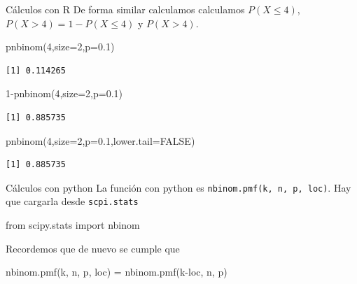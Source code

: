 \documentclass[
  ignorenonframetext,
  aspectratio=169]{beamer}
\newenvironment{Shaded}{\begin{snugshade}}{\end{snugshade}}
\newcommand{\AttributeTok}[1]{\textcolor[rgb]{0.40,0.45,0.13}{#1}}
\newcommand{\ConstantTok}[1]{\textcolor[rgb]{0.56,0.35,0.01}{#1}}
\newcommand{\DecValTok}[1]{\textcolor[rgb]{0.68,0.00,0.00}{#1}}
\newcommand{\FloatTok}[1]{\textcolor[rgb]{0.68,0.00,0.00}{#1}}
\newcommand{\FunctionTok}[1]{\textcolor[rgb]{0.28,0.35,0.67}{#1}}
\newcommand{\ImportTok}[1]{\textcolor[rgb]{0.00,0.46,0.62}{#1}}
\newcommand{\NormalTok}[1]{\textcolor[rgb]{0.00,0.23,0.31}{#1}}
\newcommand{\OperatorTok}[1]{\textcolor[rgb]{0.37,0.37,0.37}{#1}}
\newcommand{\SpecialCharTok}[1]{\textcolor[rgb]{0.37,0.37,0.37}{#1}}
\begin{document}
\begin{frame}[fragile]{Cálculos con R}
\protect\hypertarget{cuxe1lculos-con-r-3}{}
De forma similar calculamos calculamos \(P(X\leq 4)\),
\(P(X>4)=1-P(X\leq 4)\) y \(P(X>4)\).

\begin{Shaded}
\begin{Highlighting}[]
\FunctionTok{pnbinom}\NormalTok{(}\DecValTok{4}\NormalTok{,}\AttributeTok{size=}\DecValTok{2}\NormalTok{,}\AttributeTok{p=}\FloatTok{0.1}\NormalTok{)}
\end{Highlighting}
\end{Shaded}

\begin{verbatim}
[1] 0.114265
\end{verbatim}

\begin{Shaded}
\begin{Highlighting}[]
\DecValTok{1}\SpecialCharTok{{-}}\FunctionTok{pnbinom}\NormalTok{(}\DecValTok{4}\NormalTok{,}\AttributeTok{size=}\DecValTok{2}\NormalTok{,}\AttributeTok{p=}\FloatTok{0.1}\NormalTok{)}
\end{Highlighting}
\end{Shaded}

\begin{verbatim}
[1] 0.885735
\end{verbatim}

\begin{Shaded}
\begin{Highlighting}[]
\FunctionTok{pnbinom}\NormalTok{(}\DecValTok{4}\NormalTok{,}\AttributeTok{size=}\DecValTok{2}\NormalTok{,}\AttributeTok{p=}\FloatTok{0.1}\NormalTok{,}\AttributeTok{lower.tail=}\ConstantTok{FALSE}\NormalTok{)}
\end{Highlighting}
\end{Shaded}

\begin{verbatim}
[1] 0.885735
\end{verbatim}
\end{frame}

\begin{frame}[fragile]{Cálculos con python}
\protect\hypertarget{cuxe1lculos-con-python-3}{}
La función con python es \texttt{nbinom.pmf(k,\ n,\ p,\ loc)}. Hay que
cargarla desde \texttt{scpi.stats}

\begin{Shaded}
\begin{Highlighting}[]
\ImportTok{from}\NormalTok{ scipy.stats }\ImportTok{import}\NormalTok{ nbinom}
\end{Highlighting}
\end{Shaded}

Recordemos que de nuevo se cumple que

\begin{Shaded}
\begin{Highlighting}[]
\NormalTok{nbinom.pmf(k, n, p, loc) }\OperatorTok{=}\NormalTok{ nbinom.pmf(k}\OperatorTok{{-}}\NormalTok{loc, n, p)\textasciigrave{}}
\end{Highlighting}
\end{Shaded}
\end{frame}
\end{document}
